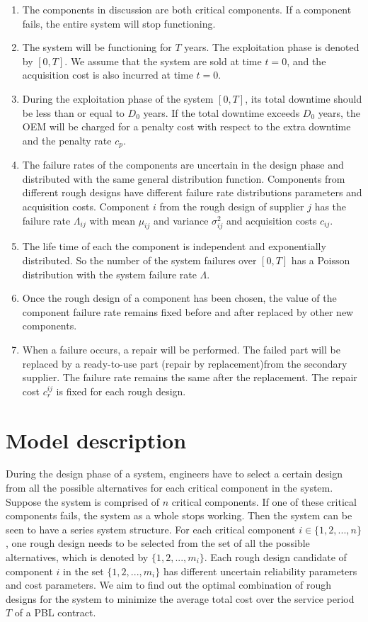 \documentclass[10pt,a4paper]{article}
\begin{document}
   \begin{enumerate}
   \item The components in discussion are both critical components. If a component fails, the entire system will stop functioning.
  \item The system will be functioning for $T$ years. The exploitation phase is denoted by $[0, T]$. We assume that the system are sold at time $t=0$, and the acquisition cost is also incurred at time $t=0$.
	 \item During the exploitation phase of the system $[0, T]$, its total downtime should be less than or equal to $D_0$ years. If the total downtime exceeds $D_0$ years, the OEM will be charged for a penalty cost with respect to the extra downtime and the penalty rate $c_p$.
	 \item The failure rates of the components are uncertain in the design phase and distributed with the same general distribution function. Components from different rough designs have different failure rate distributions parameters and acquisition costs. Component $i$ from the rough design of supplier $j$ has the failure rate $\Lambda_{ij}$ with mean $\mu_{ij}$ and variance $\sigma_{ij}^2$ and acquisition costs $c_{ij}$.
	 \item The life time of each the component is independent and exponentially distributed. So the number of the system failures over $[0, T]$ has a Poisson distribution with the system failure rate $\Lambda$.
		\item	Once the rough design of a component has been chosen, the value of the component failure rate remains fixed before and after replaced by other new components.
  \item When a failure occurs, a repair will be performed. The failed part will be replaced by a ready-to-use part (repair by replacement)from the secondary supplier. The failure rate remains the same after the replacement. The repair cost $c_r^{ij}$ is fixed for each rough design.
 	
	\end{enumerate}
\section{Model description}
During the design phase of a system, engineers have to select a certain design from all the possible alternatives for each critical component in the system. Suppose the system is comprised of $n$ critical components. If one of these critical components fails, the system as a whole stops working. Then the system can be seen to have a series system structure. For each critical component $i \in \{1,2,...,n\}$, one rough design needs to be selected from the set of all the possible alternatives, which is denoted by $\{1,2,...,m_i\}$. Each rough design candidate of component $i$ in the set $\{1,2,...,m_i\}$ has different uncertain reliability parameters and cost parameters. We aim to find out the optimal combination of rough designs for the system to minimize the average total cost over the service period $T$ of a PBL contract.
\end{document}
